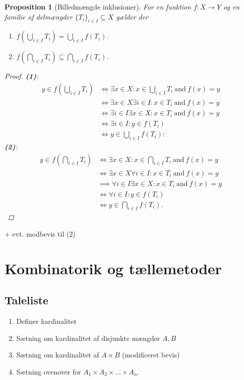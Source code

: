\documentclass[10pt,twoside,openany,final]{memoir}
\theoremstyle{break}
\newtheorem{proposition}[section]{Proposition}
\theoremstyle{Break}
\begin{document}
\begin{proposition}[Billedmængde inklusioner]
For en funktion $f \colon X \to Y$ og en familie af delmængder $\{ T_{i}\}_{i \in I} \subseteq X$ gælder der
\begin{enumerate}
\item $\displaystyle f(\bigcup_{i \in I} T_{i}) = \bigcup_{i \in I} f(T_{i})$.
\item $\displaystyle f(\bigcap_{i \in I} T_{i}) \subseteq \bigcap_{i \in I} f(T_{i})$.
\end{enumerate}
\begin{proof}
\textbf{(1)}: \begin{align*}
y \in f(\bigcup_{i \in I} T_{i}) &\iff \exists x \in X \colon x \in \bigcup_{i \in I} T_{i} \ \text{and} \ f(x)=y\\
&\iff \exists x \in X \exists i \in I \colon x \in T_{i} \ \text{and} \ f(x)=y \\
&\iff \exists i \in I \exists x \in X \colon x \in T_{i} \ \text{and} \ f(x)=y\\
&\iff \exists i \in I \colon y \in f(T_{i})\\
&\iff y \in \bigcup_{i \in I} f(T_{i}):
\end{align*}
\textbf{(2)}: 
\begin{align*}
y \in f(\bigcap_{i \in I} T_{i}) &\iff \exists x \in X \colon x \in \bigcap_{i \in I} T_{i} \ \text{and} \ f(x)=y\\
&\iff \exists x \in X \forall i \in I \colon x \in T_{i} \ \text{and} \ f(x)=y\\
&\implies \forall i \in I \exists x \in X \colon x \in T_{i} \ \text{and} \ f(x)=y\\
&\iff \forall i \in I \colon y \in f(T_{i}) \\
&\iff y \in \bigcap_{i \in I} f(T_{i}).
\end{align*}
\end{proof}
\end{proposition}

+ evt. modbevis til (2)

\chapter{Kombinatorik og tællemetoder}
\section*{Taleliste}
\begin{enumerate}
\item Definer kardinalitet
\item Sætning om kardinalitet af disjunkte mængder $A,B$
\item Sætning om kardinalitet af $A \times B$ (modificeret bevis)
\item Sætning ovenover for $A_{1} \times A_{2} \times \dots \times A_{n}$.
\end{enumerate}
\end{document}
